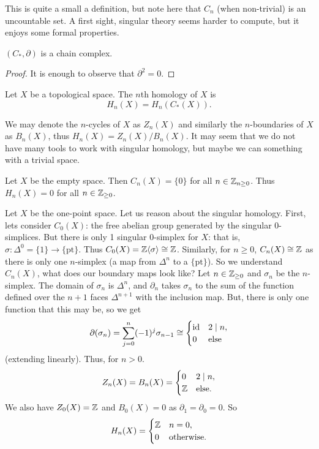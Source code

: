 This is quite a small a definition, but note here that $C_n$ (when non-trivial) is an uncountable set. A first sight, singular theory seems harder to compute, but it enjoys some formal properties.

\begin{lemma}
	$(C_*, \partial)$ is a chain complex.
\end{lemma}

\begin{proof}
	It is enough to observe that $\partial^2 = 0$.
\end{proof}

\begin{definition}
	Let $X$ be a topological space. The $n$th homology of $X$ is
	\[ H_n(X) = H_n(C_*(X)). \]
\end{definition}

We may denote the $n$-cycles of $X$ as $Z_n(X)$ and similarly the $n$-boundaries of $X$ as $B_n(X)$, thus $H_n(X) = Z_n(X) / B_n(X)$. It may seem that we do not have many tools to work with singular homology, but maybe we can something with a trivial space.

\begin{example}
	Let $X$ be the empty space. Then $C_n(X) = \{0\}$ for all $n \in \mathbb{Z}_{n \geq 0}$. Thus $H_n(X) = 0$ for all $n \in \mathbb{Z}_{\geq 0}$.
\end{example}

\begin{example}
	Let $X$ be the one-point space. Let us reason about the singular homology. First, lets consider $C_0(X)$: the free abelian group generated by the singular $0$-simplices. But there is only 1 singular $0$-simplex for $X$: that is, $\sigma: \Delta^0 = \{1\} \to \{\text{pt}\}$. Thus $C_0(X) = \mathbb{Z} \langle \sigma \rangle \cong \mathbb{Z}$. Similarly, for $n \geq 0$, $C_n(X) \cong \mathbb{Z}$ as there is only one $n$-simplex (a map from $\Delta^n$ to a $\{\text{pt}\}$). So we understand $C_n(X)$, what does our boundary maps look like? Let $n \in \mathbb{Z}_{\geq 0}$ and $\sigma_n$ be the $n$-simplex. The domain of $\sigma_n$ is $\Delta^n$, and $\partial_n$ takes $\sigma_n$ to the sum of the function defined over the $n+1$ faces $\Delta^{n+1}$ with the inclusion map. But, there is only one function that this may be, so we get
	\[
		\partial(\sigma_n) = \sum_{j=0}^n (-1)^j \sigma_{n-1} \cong
		\begin{cases}
			\operatorname{id} & 2 \mid n,   \\
			0   & \text{else}
		\end{cases}
	\]
	(extending linearly). Thus, for $n > 0$.
	\[
		Z_n(X) = B_n(X) =
		\begin{cases}
			0  & 2 \mid n,    \\
			\mathbb{Z} & \text{else}.
		\end{cases}
	\]
	We also have $Z_0(X) = \mathbb{Z}$ and $B_0(X) = 0$ as $\partial_1 = \partial_0 = 0$.
	So
	\[
		H_n(X) =
		\begin{cases}
			\mathbb{Z} & n = 0,            \\
			0  & \text{otherwise}.
		\end{cases}
	\]
\end{example}

